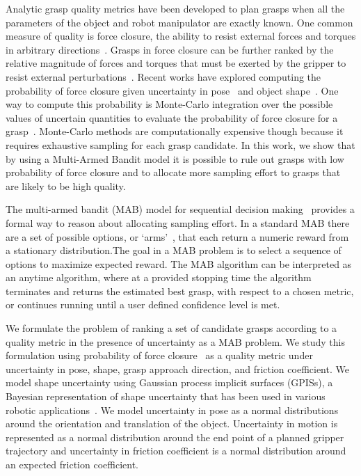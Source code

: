 \documentclass[a4paper, 10pt, conference]{ieeeconf}      %
\begin{document}
Analytic grasp quality metrics have been developed to plan grasps when all the parameters of the object and robot manipulator are exactly known.
One common measure of quality is force closure, the ability to resist external forces and torques in arbitrary directions~\cite{li1988task}.
Grasps in force closure can be further ranked by the relative magnitude of forces and torques that must be exerted by the gripper to resist external perturbations~\cite{ferrari1992}.
Recent works have explored computing the probability of  force closure given uncertainty in pose~\cite{christopoulos2007handling, kim2012physically, weisz2012pose} and object shape~\cite{kehoe2012estimating, mahler2015gp}.
 One way to compute this probability is Monte-Carlo integration over the possible values of uncertain quantities to evaluate the probability of force closure for a grasp~\cite{christopoulos2007handling, kim2012physically, weisz2012pose, kehoe2012estimating, kehoe2012towards}. Monte-Carlo methods are computationally expensive though because it requires exhaustive sampling for each grasp candidate. 
In this work, we show that by using a Multi-Armed Bandit model it is possible to rule out grasps with low probability of force closure and to allocate more sampling effort to grasps that are likely to be high quality.

The multi-armed bandit (MAB) model for sequential decision making~\cite{barto1998reinforcement, lai1985asymptotically, robbins1985some} provides a formal way to reason about allocating sampling effort. In a standard MAB there are a set of possible options, or `arms'~\cite{barto1998reinforcement}, that each return a numeric reward from a stationary distribution.The goal in a MAB problem is to  select a sequence of options to maximize expected reward. The MAB algorithm can be interpreted as an anytime algorithm, where at a provided stopping time the algorithm terminates and returns the estimated best grasp, with respect to a chosen metric, or continues running until a user defined confidence level is met. 

We formulate the problem of ranking a set of candidate grasps according to a quality metric in the presence of uncertainty as a MAB problem.
We study this formulation using probability of force closure~\cite{christopoulos2007handling, weisz2012pose, kehoe2012toward} as a quality metric under uncertainty in pose, shape, grasp approach direction, and friction coefficient. 
We model shape uncertainty using Gaussian process implicit surfaces (GPISs), a Bayesian representation of shape uncertainty that has been used in various robotic applications~\cite{dragiev2011, hollinger2013}. 
We model uncertainty in pose as a normal distributions around the orientation and translation of the object.
Uncertainty in motion is represented as a normal distribution around the end point of a planned gripper trajectory and uncertainty in friction coefficient is a normal distribution around an expected friction coefficient.
\end{document}
